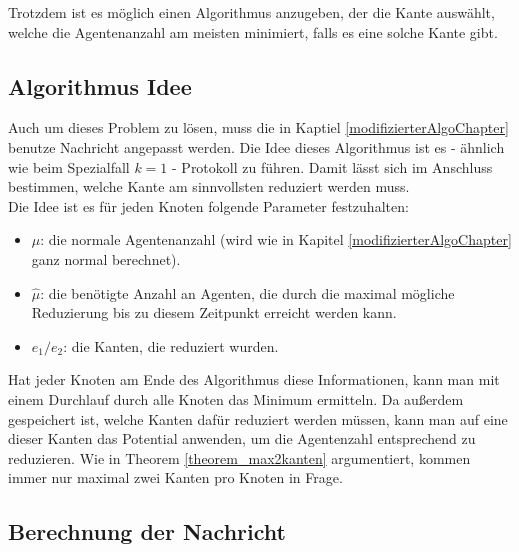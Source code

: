 Trotzdem ist es möglich einen Algorithmus anzugeben, der die Kante auswählt, welche die Agentenanzahl am meisten minimiert, falls es eine solche Kante gibt.


\subsection*{Algorithmus Idee}

	Auch um dieses Problem zu lösen, muss die in Kaptiel \ref{modifizierterAlgoChapter} benutze Nachricht angepasst werden. Die Idee dieses Algorithmus ist es - ähnlich wie beim Spezialfall $k = 1$ -  Protokoll zu führen. Damit lässt sich im Anschluss bestimmen, welche Kante am sinnvollsten reduziert werden muss.\\
	Die Idee ist es für jeden Knoten folgende Parameter festzuhalten: 
	\begin{itemize}
		\item $\mu$: die normale Agentenanzahl (wird wie in Kapitel \ref{modifizierterAlgoChapter} ganz normal berechnet).
		\item $\hat{\mu}$: die benötigte Anzahl an  Agenten, die durch die maximal mögliche Reduzierung bis zu diesem Zeitpunkt erreicht werden kann.
		\item $e_{1} / e_{2}$: die Kanten, die reduziert wurden.
	\end{itemize}
	Hat jeder Knoten am Ende des Algorithmus diese Informationen, kann man mit einem Durchlauf durch alle Knoten das Minimum ermitteln. Da außerdem gespeichert ist, welche Kanten dafür reduziert werden müssen, kann man auf eine dieser Kanten das Potential anwenden, um die Agentenzahl entsprechend zu reduzieren. Wie in Theorem \ref{theorem_max2kanten} argumentiert, kommen immer nur maximal zwei Kanten pro Knoten in Frage.
	
	\subsection*{Berechnung der Nachricht}
	
